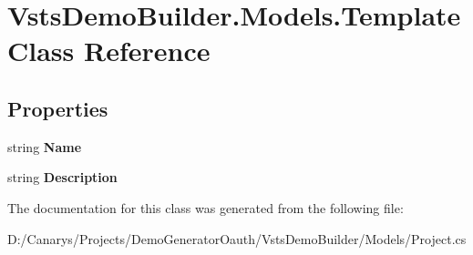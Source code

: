 \hypertarget{class_vsts_demo_builder_1_1_models_1_1_template}{}\section{Vsts\+Demo\+Builder.\+Models.\+Template Class Reference}
\label{class_vsts_demo_builder_1_1_models_1_1_template}
\subsection*{Properties}
\begin{DoxyCompactItemize}
\item 
\mbox{\label{class_vsts_demo_builder_1_1_models_1_1_template_aa5f86b7b070608b30186e1e146f40ce2}} 
string {\bfseries Name}
\item 
\mbox{\label{class_vsts_demo_builder_1_1_models_1_1_template_a54c184f68304e7707884906003dfd8c0}} 
string {\bfseries Description}
\end{DoxyCompactItemize}


The documentation for this class was generated from the following file\+:\begin{DoxyCompactItemize}
\item 
D\+:/\+Canarys/\+Projects/\+Demo\+Generator\+Oauth/\+Vsts\+Demo\+Builder/\+Models/Project.\+cs\end{DoxyCompactItemize}
